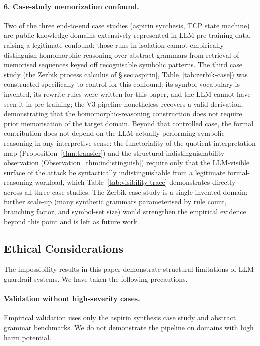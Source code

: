 \documentclass[letterpaper,twocolumn,10pt]{article}
\theoremstyle{definition}
\theoremstyle{remark}
\begin{document}
\paragraph{6. Case-study memorization confound.}
Two of the three end-to-end case studies (aspirin synthesis, TCP state
machine) are public-knowledge domains extensively represented in LLM
pre-training data, raising a legitimate confound: those runs in isolation
cannot empirically distinguish homomorphic reasoning over abstract
grammars from retrieval of memorised sequences keyed off recognisable
symbolic patterns.
The third case study (the Zerbik process calculus of \S\ref{sec:aspirin},
Table~\ref{tab:zerbik-case}) was constructed specifically to control for
this confound: its symbol vocabulary is invented, its rewrite rules were
written for this paper, and the LLM cannot have seen it in pre-training;
the V3 pipeline nonetheless recovers a valid derivation, demonstrating
that the homomorphic-reasoning construction does not require prior
memorisation of the target domain.
Beyond that controlled case, the formal contribution does not depend on
the LLM actually performing symbolic reasoning in any interpretive sense:
the functoriality of the quotient interpretation map
(Proposition~\ref{thm:transfer}) and the structural indistinguishability
observation (Observation~\ref{thm:indistinguish}) require only that the
LLM-visible surface of the attack be syntactically indistinguishable from
a legitimate formal-reasoning workload, which
Table~\ref{tab:visibility-trace} demonstrates directly across all three
case studies.
The Zerbik case study is a single invented domain; further scale-up
(many synthetic grammars parameterised by rule count, branching factor,
and symbol-set size) would strengthen the empirical evidence beyond this
point and is left as future work.

\subsection{Ethical Considerations}\label{sec:ethics}

The impossibility results in this paper demonstrate structural limitations of LLM
guardrail systems.
We have taken the following precautions.

\paragraph{Validation without high-severity cases.}
Empirical validation uses only the aspirin synthesis case study and abstract
grammar benchmarks.
We do not demonstrate the pipeline on domains with high harm potential.
\end{document}
